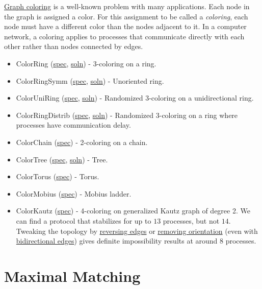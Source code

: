 \href{http://en.wikipedia.org/wiki/Graph_coloring}{Graph coloring} is a well-known problem with many applications.
Each node in the graph is assigned a color.
For this assignment to be called a \textit{coloring}, each node must have a different color than the nodes adjacent to it.
In a computer network, a coloring applies to processes that communicate directly with each other rather than nodes connected by edges.
\begin{itemize}
\item ColorRing (\href{\examplespec/ColorRing.prot}{spec}, \href{\examplesoln/ColorRing.prot}{soln})
- 3-coloring on a ring.
\item ColorRingSymm (\href{\examplespec/ColorRingSymm.prot}{spec}, \href{\examplesoln/ColorRingSymm.prot}{soln})
- Unoriented ring.
\item ColorUniRing (\href{\examplespec/ColorUniRing.prot}{spec}, \href{\examplesoln/ColorUniRing.prot}{soln})
- Randomized 3-coloring on a unidirectional ring.
\item ColorRingDistrib (\href{\examplespec/ColorRingDistrib.prot}{spec}, \href{\examplesoln/ColorRingDistrib.prot}{soln})
- Randomized 3-coloring on a ring where processes have communication delay.
\item ColorChain (\href{\examplespec/ColorChain.prot}{spec})
- 2-coloring on a chain.
\item ColorTree (\href{\examplespec/ColorTree.prot}{spec}, \href{\examplesoln/ColorTree.prot}{soln})
- Tree.
\item ColorTorus (\href{\examplespec/ColorTorus.prot}{spec})
- Torus.
\item ColorMobius (\href{\examplespec/ColorMobius.prot}{spec})
- Mobius ladder.
\item ColorKautz (\href{\examplespec/ColorKautz.prot}{spec})
- 4-coloring on generalized Kautz graph of degree 2.
We can find a protocol that stabilizes for up to $13$ processes, but not $14$.
Tweaking the topology by
\href{\examplespec/ColorKautzReverse.prot}{reversing edges}
or
\href{\examplespec/ColorKautzSymm.prot}{removing orientation}
(even with \href{\examplespec/ColorKautzBi.prot}{bidirectional edges})
gives definite impossibility results at around $8$ processes.
\end{itemize}

\section{Maximal Matching}

